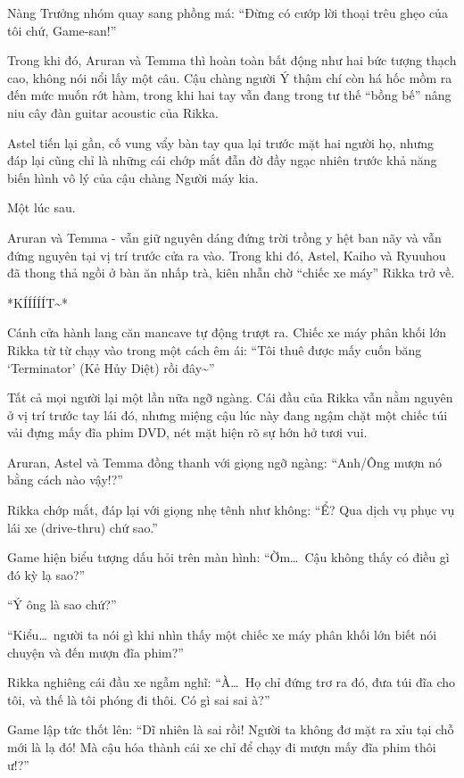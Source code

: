 \documentclass[../main.tex]{subfiles}
\begin{document}
Nàng Trưởng nhóm quay sang phồng má: ``Đừng có cướp lời thoại trêu ghẹo của tôi chứ, Game-san!''

Trong khi đó, Aruran và Temma thì hoàn toàn bất động như hai bức tượng thạch cao, không nói nổi lấy một câu. Cậu chàng người Ý thậm chí còn há hốc mồm ra đến mức muốn rớt hàm, trong khi hai tay vẫn đang trong tư thế ``bồng bế'' nâng niu cây đàn guitar acoustic của Rikka.

Astel tiến lại gần, cố vung vẩy bàn tay qua lại trước mặt hai người họ, nhưng đáp lại cũng chỉ là những cái chớp mắt đẫn đờ đầy ngạc nhiên trước khả năng biến hình vô lý của cậu chàng Người máy kia.

\ct

Một lúc sau.

Aruran và Temma - vẫn giữ nguyên dáng đứng trời trồng y hệt ban nãy và vẫn đứng nguyên tại vị trí trước cửa ra vào. Trong khi đó, Astel, Kaiho và Ryuuhou đã thong thả ngồi ở bàn ăn nhấp trà, kiên nhẫn chờ ``chiếc xe máy'' Rikka trở về.

*KÍÍÍÍÍT\~{}*

Cánh cửa hành lang căn mancave tự động trượt ra. Chiếc xe máy phân khối lớn Rikka từ từ chạy vào trong một cách êm ái: ``Tôi thuê được mấy cuốn băng `Terminator' (Kẻ Hủy Diệt) rồi đây\~{}''

Tất cả mọi người lại một lần nữa ngỡ ngàng. Cái đầu của Rikka vẫn nằm nguyên ở vị trí trước tay lái đó, nhưng miệng cậu lúc này đang ngậm chặt một chiếc túi vải đựng mấy đĩa phim DVD, nét mặt hiện rõ sự hớn hở tươi vui.


Aruran, Astel và Temma đồng thanh với giọng ngỡ ngàng: ``Anh/Ông mượn nó bằng cách nào vậy!?''

Rikka chớp mắt, đáp lại với giọng nhẹ tênh như không: ``Ể? Qua dịch vụ phục vụ lái xe (drive-thru) chứ sao.''

Game hiện biểu tượng dấu hỏi trên màn hình: ``Ờm\dots\ Cậu không thấy có điều gì đó kỳ lạ sao?''

``Ý ông là sao chứ?''

``Kiểu\dots\ người ta nói gì khi nhìn thấy một chiếc xe máy phân khối lớn biết nói chuyện và đến mượn đĩa phim?''

Rikka nghiêng cái đầu xe ngẫm nghĩ: ``À\dots\ Họ chỉ đứng trơ ra đó, đưa túi đĩa cho tôi, và thế là tôi phóng đi thôi. Có gì sai sai à?''

Game lập tức thốt lên: ``Dĩ nhiên là sai rồi! Người ta không đơ mặt ra xỉu tại chỗ mới là lạ đó! Mà cậu hóa thành cái xe chỉ để chạy đi mượn mấy đĩa phim thôi ư!?''
\end{document}
